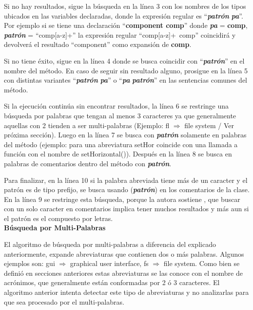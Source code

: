 Si no hay resultados, sigue la búsqueda en la línea 3 con los nombres de los tipos ubicados en las variables declaradas, donde la expresión regular es “\textit{\textbf{patrón}} \textit{\textbf{pa}}”. Por ejemplo si se tiene una declaración “\textbf{component comp}” donde \textit{\textbf{pa}} = \textbf{comp}, \textit{\textbf{patrón}} = “comp[a-z]+”  la expresión regular \mbox{“comp[a-z]+ comp”} coincidirá y devolverá el resultado  “component” como expansión de \textbf{comp}.

Si no tiene éxito, sigue en la línea 4 donde se busca coincidir con “\textit{\textbf{patrón}}” en el nombre del método. En caso de seguir sin resultado alguno, prosigue en la línea 5 con distintas variantes “\textit{\textbf{patrón}} \textit{\textbf{pa}}” o “\textit{\textbf{pa}} \textit{\textbf{patrón}}” en las sentencias comunes del método. 


Si la ejecución continúa sin encontrar resultados, la línea 6 se restringe una búsqueda por palabras que tengan al menos 3 caracteres ya que generalmente aquellas con 2 tienden a ser multi-palabras (Ejemplo: \textsf{fl $\Rightarrow$ file system} / Ver próxima sección). Luego en la línea 7 se busca con \textit{\textbf{patrón}} solamente en palabras del método (ejemplo: para una abreviatura \textsf{setHor} coincide con una llamada a función con el nombre de \textsf{setHorizontal()}). Después en la línea 8 se busca en palabras de comentarios dentro del método con \textit{\textbf{patrón}}.

Para finalizar, en la línea 10 si la palabra abreviada tiene más de un caracter y el patrón es de tipo prefijo, se busca usando (\textit{\textbf{patrón}}) en los comentarios de la clase. En la línea 9 se restringe esta búsqueda, porque la autora sostiene \cite{EZH08}, que buscar con un solo caracter en comentarios implica tener muchos resultados y más aun si el patrón es el compuesto por letras.\\

\noindent \textbf{Búsqueda por Multi-Palabras\\}

El algoritmo de búsqueda por multi-palabras a diferencia del explicado anteriormente, expande abreviaturas que contienen dos o más palabras. Algunos ejemplos son: \textsf{gui $\Rightarrow$ graphical user interface, fs $\Rightarrow$ file system}. Como bien se definió en secciones anteriores estas abreviaturas se las conoce con el nombre de acrónimos, que generalmente están conformadas por 2 ó 3 caracteres. El algoritmo anterior intenta detectar este tipo de abreviaturas y no analizarlas para que sea procesado por el multi-palabras.

